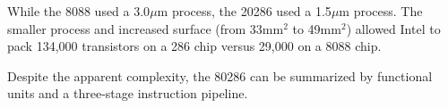 \documentclass[book.tex]{subfiles}
\begin{document}
\par
While the 8088 used a 3.0$\mu$m process, the 20286 used a 1.5$\mu$m process. The smaller process and increased surface (from 33mm$^2$ to 49mm$^2$) allowed Intel to pack 134,000 transistors on a 286 chip versus 29,000 on a 8088 chip.\\


\par \vspace{-1pt}
\begin{minipage}{0.48\textwidth}
\centering
{} 

\end{minipage}
\hfill
\begin{minipage}{0.48\textwidth}
\centering
{}
\end{minipage}



 \pagebreak

\par Despite the apparent complexity, the 80286 can be summarized by functional units and a three-stage instruction pipeline.
\end{document}
